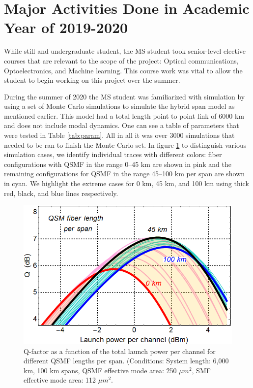 \documentclass{report}
\begin{document}
\section{Major Activities Done in Academic Year of 2019-2020}

While still and undergraduate student, the MS student took senior-level elective courses that are relevant to the scope of the project: Optical communications, Optoelectronics, and Machine learning. This course work was vital to allow the student to begin working on this project over the summer.

During the summer of 2020 the MS student was familiarized with simulation by using a set of Monte Carlo simulations to simulate the hybrid span model as mentioned earlier. This model had a total length point to point link of 6000 km and does not include modal dynamics. One can see a table of parameters that were tested in Table \ref{tab:param}.  All in all it was over 3000 simulations that needed to be ran to finish the Monte Carlo set. In figure \ref{fig:graphit} to distinguish various simulation cases, we identify individual traces with different colors: fiber configurations with QSMF in the range 0–45 km are shown in pink and the remaining configurations for QSMF in the range 45–100 km per span are shown in cyan. We highlight the extreme cases for 0 km, 45 km, and 100 km using thick red, black, and blue lines respectively.

\begin{figure}
    \centering
    \includegraphics[scale=0.4]{Q0dBvsQSMFlengthplot_6000km_100kmspans_250_112um2_MC_AllTracesPlot_0MPIComp_v02.png}
    \caption{Q-factor as a function of the total launch power per channel for different QSMF lengths per span. (Conditions: System length: 6,000 km, 100 km spans, QSMF effective mode area: 250 $\mu m^2 $, SMF effective mode area: 112 $\mu m^2 $.}
    \label{fig:graphit}
\end{figure}
\end{document}
